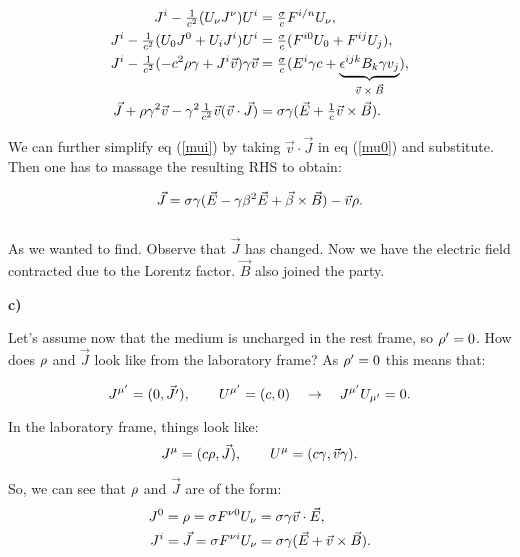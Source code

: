 \begin{equation}\label{mui}
	\begin{split}
		J^{i} - \tfrac{1}{c^{2}} (U_{\nu }J^{\nu })U^{i } &= \tfrac{\sigma}{c} F^{i/n }U_{\nu },\\
		J^{i} - \tfrac{1}{c^{2}} (U_{0 }J^{0 } + U_{i }J^{i })U^{i } &= \tfrac{\sigma}{c} (F^{i0 }U_{0 } + F^{ij }U_{j }),\\
		J^{i} - \tfrac{1}{c^{2}} (- c^{2}\rho\gamma + J^{i }\vec{v})\gamma\vec{v} &= \tfrac{\sigma}{c} (E^{i}\gamma c + \underbrace{\epsilon^{ijk}B_{k}\gamma v_{j}}_{\text{$\vec{v}\times \vec{B}$}}),\\
		\vec{J} + \rho \gamma^{2} \vec{v} - \gamma^{2}\tfrac{1}{c^{2}}\vec{v}(\vec{v}\cdot \vec{J}) &= \sigma \gamma (\vec{E}+ \tfrac{1}{c} \vec{v}\times \vec{B}).
	\end{split}
\end{equation}

We can further simplify eq (\ref{mui}) by taking $\vec{v}\cdot \vec{J}$ in eq (\ref{mu0}) and substitute. Then one has to massage the resulting RHS to obtain:

\begin{equation}
	\vec{J} = \sigma \gamma (\vec{E}-\gamma \beta^{2}\vec{E}+ \vec{\beta}\times \vec{B})-\vec{v}\rho.
\end{equation}\\
As we wanted to find. Observe that $\vec{J}$ has changed. Now we have the electric field contracted due to the Lorentz factor. $\vec{B}$ also joined the party.

\textbf{c)}

Let's assume now that the medium is uncharged in the rest frame, so $\rho' = 0$. How does $\rho $ and $\vec{J}$ look like from the laboratory frame? As $\rho'=0$ this means that:

\begin{equation}
	J^{\mu' }= (0, \vec{J'}), \quad \quad U^{\mu' } = (c,0) \quad \rightarrow \quad J^{\mu' } U_{\mu' }= 0.
\end{equation}

In the laboratory frame, things look like:
\begin{equation}
	J^{\mu } = (c \rho, \vec{J}), \quad \quad U^{\mu }=(c \gamma, \vec{v}\gamma).
\end{equation}

So, we can see that $\rho$ and $\vec{J}$ are of the form:
\begin{equation}
	\begin{split}
		J^{0 } &= \rho = \sigma F^{\nu0 } U_{\nu } = \sigma   \gamma \vec{v}\cdot \vec{E},\\
		J^{i } &=\vec{J} = \sigma F^{\nu i  }U_{\nu } = \sigma \gamma (\vec{E} +  \vec{v}\times \vec{B}).
	\end{split}
\end{equation}


